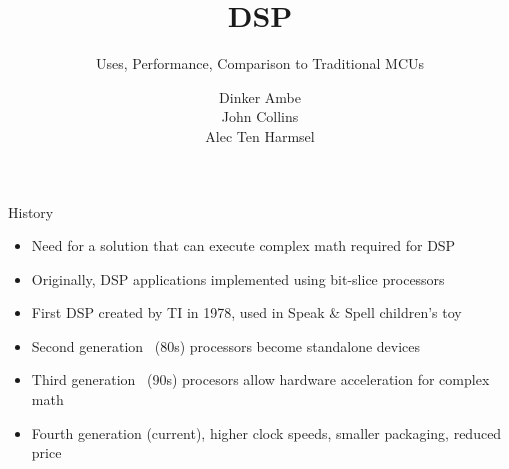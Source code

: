 \documentclass{beamer}
\begin{document}
\beamertemplatenavigationsymbolsempty

\title{DSP}
\subtitle{Uses, Performance, Comparison to Traditional MCUs}
\author{Dinker Ambe\\
John Collins\\
Alec Ten Harmsel}


\frame{\titlepage}

\begin{frame}{History}
    \begin{itemize}
        \item Need for a solution that can execute complex math required for DSP
        \item Originally, DSP applications implemented using bit-slice processors
        \item First DSP created by TI in 1978, used in Speak \& Spell children's toy
        \item Second generation ~(80s) processors become standalone devices
        \item Third generation ~(90s) procesors allow hardware acceleration for complex math
        \item Fourth generation (current), higher clock speeds, smaller packaging, reduced price
    \end{itemize}
\end{frame}
\end{document}
